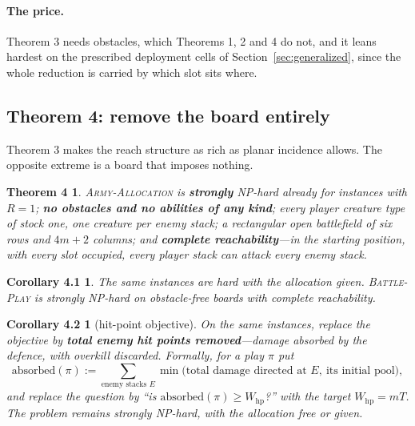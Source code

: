\documentclass[11pt,a4paper]{article}
\theoremstyle{plain}
\newtheorem*{thmfour}{Theorem 4}
\newtheorem*{corfourone}{Corollary 4.1}
\newtheorem*{corfourtwo}{Corollary 4.2}
\theoremstyle{definition}
\theoremstyle{plain}
\theoremstyle{definition}
\theoremstyle{remark}
\newcommand{\ALLOC}{\textsc{Army-Allocation}}
\newcommand{\PLAY}{\textsc{Battle-Play}}
\begin{document}
\paragraph{The price.} Theorem 3 needs obstacles, which Theorems 1, 2 and 4 do not, and it leans
hardest on the prescribed deployment cells of Section~\ref{sec:generalized}, since the whole reduction
is carried by which slot sits where.

\subsection{Theorem 4: remove the board entirely}\label{sec:thm4}

Theorem 3 makes the reach structure as rich as planar incidence allows. The opposite extreme is
a board that imposes nothing.

\begin{thmfour}
\ALLOC{} is \textbf{strongly} NP-hard already for instances with $R=1$; \textbf{no obstacles and
no abilities of any kind}; every \emph{player} creature type of stock one, one creature per enemy stack; a
rectangular open battlefield of six rows and $4m+2$ columns; and \textbf{complete
reachability}---in the starting position, with every slot occupied, every player stack can
attack every enemy stack.
\end{thmfour}

\begin{corfourone}
The same instances are hard with the allocation \emph{given}. \PLAY{} is strongly NP-hard on
obstacle-free boards with complete reachability.
\end{corfourone}

\begin{corfourtwo}[hit-point objective]
On the same instances, replace the objective by \textbf{total enemy hit points
removed}---damage absorbed by the defence, with overkill discarded. Formally, for a play $\pi$ put
\[
  \mathrm{absorbed}(\pi):=\sum_{\text{enemy stacks }E}
    \min\bigl(\text{total damage directed at }E,\ \text{its initial pool}\bigr),
\]
and replace the question by ``is $\mathrm{absorbed}(\pi)\ge W_{\mathrm{hp}}$?'' with the
target $W_{\mathrm{hp}}=mT$. The problem remains strongly NP-hard, with the allocation free or
given.
\end{corfourtwo}
\end{document}
